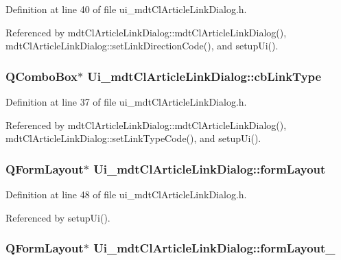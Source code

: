 Definition at line 40 of file ui\-\_\-mdt\-Cl\-Article\-Link\-Dialog.\-h.



Referenced by mdt\-Cl\-Article\-Link\-Dialog\-::mdt\-Cl\-Article\-Link\-Dialog(), mdt\-Cl\-Article\-Link\-Dialog\-::set\-Link\-Direction\-Code(), and setup\-Ui().

\hypertarget{class_ui__mdt_cl_article_link_dialog_a09604109a10657c71de819099aa2a9fe}{
\subsubsection[{cb\-Link\-Type}]{\setlength{\rightskip}{0pt plus 5cm}Q\-Combo\-Box$\ast$ Ui\-\_\-mdt\-Cl\-Article\-Link\-Dialog\-::cb\-Link\-Type}}\label{class_ui__mdt_cl_article_link_dialog_a09604109a10657c71de819099aa2a9fe}


Definition at line 37 of file ui\-\_\-mdt\-Cl\-Article\-Link\-Dialog.\-h.



Referenced by mdt\-Cl\-Article\-Link\-Dialog\-::mdt\-Cl\-Article\-Link\-Dialog(), mdt\-Cl\-Article\-Link\-Dialog\-::set\-Link\-Type\-Code(), and setup\-Ui().

\hypertarget{class_ui__mdt_cl_article_link_dialog_a52541f497b55d3ca641067aaada9f2cf}{
\subsubsection[{form\-Layout}]{\setlength{\rightskip}{0pt plus 5cm}Q\-Form\-Layout$\ast$ Ui\-\_\-mdt\-Cl\-Article\-Link\-Dialog\-::form\-Layout}}\label{class_ui__mdt_cl_article_link_dialog_a52541f497b55d3ca641067aaada9f2cf}


Definition at line 48 of file ui\-\_\-mdt\-Cl\-Article\-Link\-Dialog.\-h.



Referenced by setup\-Ui().

\hypertarget{class_ui__mdt_cl_article_link_dialog_aa94c22d74e8881d63410b8769d0381c3}{
\subsubsection[{form\-Layout\-\_\-2}]{\setlength{\rightskip}{0pt plus 5cm}Q\-Form\-Layout$\ast$ Ui\-\_\-mdt\-Cl\-Article\-Link\-Dialog\-::form\-Layout\-\_}}\label{class_ui__mdt_cl_article_link_dialog_aa94c22d74e8881d63410b8769d0381c3}


